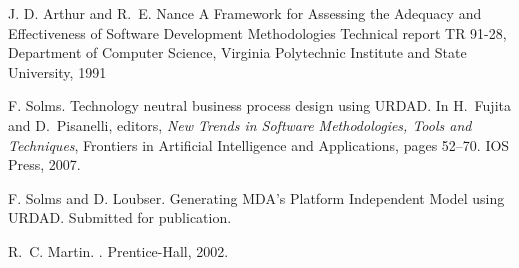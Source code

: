 \documentclass{llncs}
\begin{document}
\begin{thebibliography}{10}

J. D. Arthur and R.~E. Nance
\newblock A Framework for Assessing the Adequacy and Effectiveness of Software Development Methodologies
\newblock Technical report TR 91-28, Department of Computer Science, Virginia Polytechnic Institute and State University, 1991

F. Solms.
\newblock Technology neutral business process design using {URDAD}.
\newblock In H.~Fujita and D.~Pisanelli, editors, {\em New Trends in Software
  Methodologies, Tools and Techniques}, Frontiers in Artificial Intelligence
  and Applications, pages 52--70. IOS Press, 2007.

F. Solms and D. Loubser.
\newblock Generating MDA's Platform Independent Model using {URDAD}.
\newblock Submitted for publication.

R.~C. Martin.
.
\newblock Prentice-Hall, 2002.

\end{thebibliography}
\end{document}
